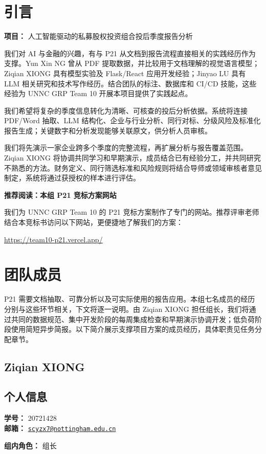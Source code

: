 \documentclass[a4paper,12pt]{article}
\title{\BidTitle}
\author{\BidTeam}
\date{\BidDate}
\newcommand{\PersonalInformation}[2]{%
  \subsection*{个人信息}
  \if\relax\detokenize{#1}\relax\else
  \noindent\textbf{学号：} #1\\
  \fi
  \textbf{邮箱：} #2\par
}
\newcommand{\BidProjectName}{人工智能驱动的私募股权投资组合投后季度报告分析}
\begin{document}
\maketitle
\thispagestyle{plain}
\tableofcontents
\newpage

\section{引言}
\noindent\textbf{项目：} \BidProjectName
\par\medskip
我们对 AI 与金融的兴趣，有与 P21 从文档到报告流程直接相关的实践经历作为支撑。Yun Xin NG 曾从 PDF 提取数据，并比较用于文档理解的视觉语言模型；Ziqian XIONG 具有模型实验及 Flask/React 应用开发经验；Jinyao LU 具有 LLM 相关研究和技术写作经历。结合团队的标注、数据库和 CI/CD 技能，这些经验为 UNNC GRP Team 10 开展本项目提供了实践起点。

我们希望将复杂的季度信息转化为清晰、可核查的投后分析依据。系统将连接 PDF/Word 抽取、LLM 结构化、企业与行业分析、同行对标、分级风险及标准化报告生成；关键数字和分析发现能够关联原文，供分析人员审核。

我们将先演示一家企业跨多个季度的完整流程，再扩展分析与报告覆盖范围。Ziqian XIONG 将协调共同学习和早期演示，成员结合已有经验分工，并共同研究不熟悉的方法。财务定义、同行筛选标准和风险规则将结合导师或领域审核者意见制定，系统将通过获授权的样本进行评估。

\medskip
\noindent\textbf{推荐阅读：本组 P21 竞标方案网站}\par
我们为 UNNC GRP Team 10 的 P21 竞标方案制作了专门的网站。推荐评审老师结合本竞标书访问以下网站，更便捷地了解我们的方案：\par
\noindent\url{https://team10-p21.vercel.app/}

\newpage
\section{团队成员}
P21 需要文档抽取、可靠分析以及可实际使用的报告应用。本组七名成员的经历分别与这些环节相关，下文将逐一说明。由 Ziqian XIONG 担任组长，我们将通过共同的数据规范、集中开发阶段的每周集成检查和早期演示协调开发；低负荷阶段使用简短异步简报。以下简介展示支撑项目方案的成员经历，具体职责见任务分配章节。

\subsection{Ziqian XIONG}
\PersonalInformation{20721428}{\href{mailto:scyzx7@nottingham.edu.cn}{\nolinkurl{scyzx7@nottingham.edu.cn}}}
\noindent\textbf{组内角色：} 组长\par
\end{document}

